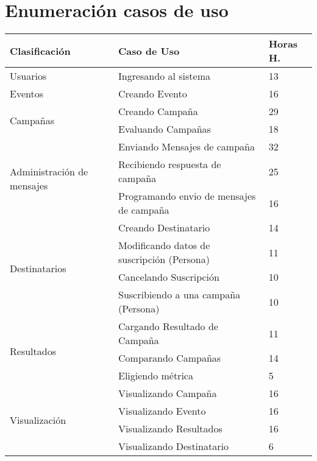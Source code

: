 \documentclass[a4paper, 11pt]{article}
\begin{document}
\newpage
\section{Enumeraci\'on casos de uso}


\begin{table}[H]
\centering
\begin{tabular}{ | p{5cm} | p{8cm} | p{1.5cm} | }
\hline
Clasificación & Caso de Uso & Horas H.\\ \hline \hline
Usuarios & Ingresando al sistema & 13 \\ \hline
Eventos & Creando Evento & 16 \\ \hline
\multirow{2}{5cm}{Campañas} & Creando Campaña & 29 \\ \cline{2-3} 
& Evaluando Campañas & 18 \\ \hline
\multirow{3}{5cm}{Administración de mensajes} & Enviando Mensajes de campaña & 32 \\ \cline{2-3} 
& Recibiendo respuesta de campaña & 25 \\ \cline{2-3} 
& Programando envio de mensajes de campaña & 16 \\ \hline
\multirow{4}{5cm}{Destinatarios} & Creando Destinatario & 14 \\  \cline{2-3} 
& Modificando datos de suscripci\'on (Persona) & 11 \\ \cline{2-3} 
& Cancelando Suscripci\'on & 10 \\ \cline{2-3} 
& Suscribiendo a una campaña (Persona) & 10 \\ \hline 
\multirow{3}{5cm}{Resultados} & Cargando Resultado de Campaña & 11 \\ \cline{2-3} 
& Comparando Campañas & 14 \\ \cline{2-3} 
& Eligiendo métrica & 5 \\ \hline
\multirow{4}{5cm}{Visualización} & Visualizando Campaña & 16 \\ \cline{2-3} 
& Visualizando Evento & 16 \\ \cline{2-3} 
& Visualizando Resultados & 16 \\ \cline{2-3} 
& Visualizando Destinatario & 6 \\ \hline

\end{tabular}
\end{table}
\end{document}
